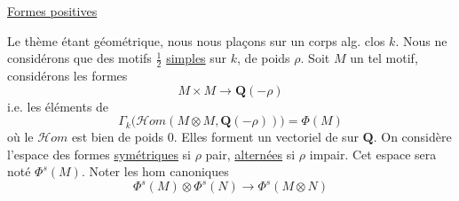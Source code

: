 \uline{Formes positives}

Le thème étant géométrique, nous nous plaçons
sur un corps alg. clos $k$. Nous ne
considérons que des motifs $\frac12$ \uline{simples}
sur $k$,  de poids $\rho$. Soit $M$ un tel
motif, considérons les formes
\[
M\times M\longrightarrow\mathbf Q(-\rho)
\]
i.e. les éléments de
\[
\Gamma_k\bigl(\mathcal Hom(M\otimes M,\mathbf Q(-\rho))\bigr)=\Phi(M)
\]
où le  $\mathcal Hom$ est bien de poids $0$.
Elles forment un vectoriel de 
sur $\mathbf Q$. On considère l'espace des
formes \uline{symétriques} si
$\rho$ pair, \uline{alternées} si $\rho$ impair. Cet
espace sera noté $\Phi^s(M)$. Noter les
hom canoniques
\[
\Phi^s(M)\otimes\Phi^s(N)\longrightarrow\Phi^s(M\otimes N)
\]
